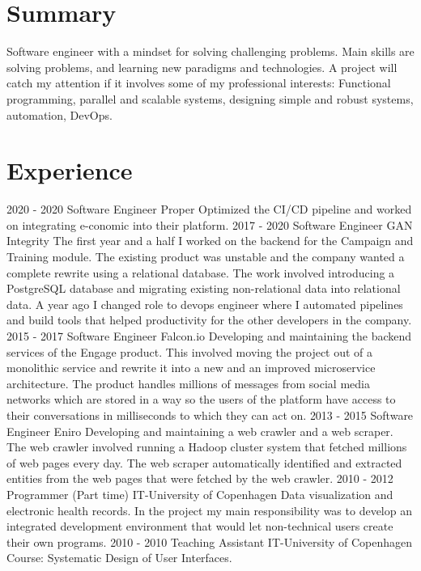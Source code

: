 \documentclass[]{friggeri-cv}
\begin{document}
\section{Summary}
Software engineer with a mindset for solving challenging problems. Main skills are solving problems, and learning new paradigms and technologies. A project will catch my attention if it involves some of my professional interests: Functional programming, parallel and scalable systems, designing simple and robust systems, automation, DevOps.

\section{Experience}
\begin{entrylist}
    \entry
    {2020 - 2020}
    {Software Engineer}
    {Proper}
    {Optimized the CI/CD pipeline and worked on integrating e-conomic into their platform.}
    \entry
    {2017 - 2020}
    {Software Engineer}
    {GAN Integrity}
    {The first year and a half I worked on the backend for the Campaign and Training module. The existing product was unstable and the company wanted a complete rewrite using a relational database.  
    The work involved introducing a PostgreSQL database and migrating existing non-relational data into relational data.
    A year ago I changed role to devops engineer where I automated pipelines and build tools that helped productivity for the other developers in the company.}
    \entry
    {2015 - 2017}
    {Software Engineer}
    {Falcon.io}
    {Developing and maintaining the backend services of the Engage product. This involved moving the project out of a monolithic service and rewrite it into a new and an improved microservice architecture. The product handles millions of messages from social media networks which are stored in a way so the users of the platform have access to their conversations in milliseconds to which they can act on.}
    \entry
    {2013 - 2015}
    {Software Engineer}
    {Eniro}
    {Developing and maintaining a web crawler and a web scraper. The web crawler involved running a Hadoop cluster system that fetched millions of web pages every day. The web scraper automatically identified and extracted entities from the web pages that were fetched by the web crawler.}
    \entry
    {2010 - 2012}
    {Programmer (Part time)}
    {IT-University of Copenhagen}
    {Data visualization and electronic health records. In the project my main responsibility was to develop an integrated development environment that would let non-technical users create their own programs.}
    \entry
    {2010 - 2010}
    {Teaching Assistant}
    {IT-University of Copenhagen}
    {Course: Systematic Design of User Interfaces.}


\end{entrylist}
\end{document}
